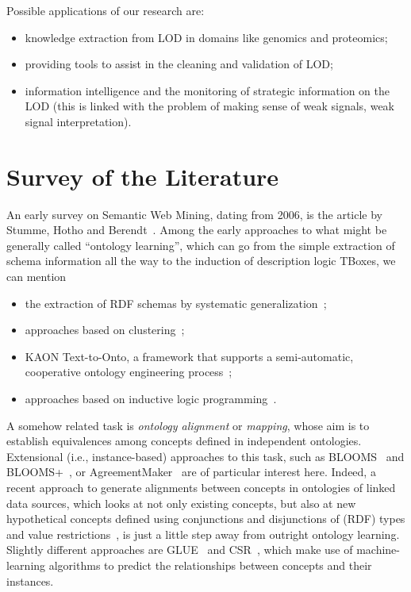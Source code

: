\documentclass[a4paper]{article}
\newcounter{ex}
\begin{document}
Possible applications of our research are:
\begin{itemize}
\item knowledge extraction from LOD in domains like genomics and proteomics;
\item providing tools to assist in the cleaning and validation of LOD;
\item information intelligence and the monitoring of strategic information on the LOD
  (this is linked with the problem of making sense of weak signals,
  weak signal interpretation).
\end{itemize}

\section{Survey of the Literature}
\label{sec:survey}

An early survey on Semantic Web Mining, dating from 2006, is the article by
Stumme, Hotho and Berendt~\cite{StummeHothoBerendt2006}.
Among the early approaches to what might be generally called ``ontology learning'',
which can go from the simple extraction of schema information all the way to the
induction of description logic TBoxes, we can mention
\begin{itemize}
\item the extraction of RDF schemas by systematic generalization~\cite{DelteilFaronDieng2001};
\item approaches based on clustering~\cite{MaedcheZacharias2002};
\item KAON Text-to-Onto, a framework that supports a semi-automatic, cooperative
  ontology engineering process~\cite{MaedcheStaab2004};
\item approaches based on inductive logic programming~\cite{GrimnesEdwardsPreece2004}.
\end{itemize}

A somehow related task is \emph{ontology alignment} or \emph{mapping},
whose aim is to establish equivalences among concepts defined in independent ontologies.
Extensional (i.e., instance-based) approaches to this task, such as
BLOOMS~\cite{JainHitzlerShethVermaYeh2010}
and BLOOMS+~\cite{JainYehVermaVasquezDamovaHitzlerSheth2011},
or AgreementMaker~\cite{CruzPalmonariCaimiStroe2013}
are of particular interest here.
Indeed, a recent approach to generate alignments between concepts
in ontologies of linked data sources, which looks at not only existing concepts,
but also at new hypothetical concepts defined using conjunctions and
disjunctions of (RDF) types and value restrictions~\cite{ParundekarKnoblockAmbite2012},
is just a little step away from outright ontology learning.
Slightly different approaches are
GLUE~\cite{DoanMadhavanDomingosHalevy2004}
and CSR~\cite{SpiliopoulosValarakosVouros2008},
which make use of machine-learning algorithms to predict the relationships
between concepts and their instances.
\end{document}

